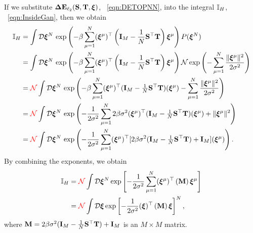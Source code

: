 If we substitute $\mathbf{\Delta {E}}_{\ell_2}({\mathbf{S}},{\mathbf{T}}, \boldsymbol{\xi})$, \EQN~\ref{eqn:DETOPNN}, into the integral $\mathbb{I}_{H}$, \EQN~\ref{eqn:InsideGan}, then we obtain
\begin{align}
\label{eqn:I_1} 
\mathbb{I}_{H} 
  & =  \int \mathcal{D}\boldsymbol{\xi}^{N} \, \exp \left( -\beta\sum_{\mu=1}^{N} (\boldsymbol{\xi}^{\mu})^{\top} \left(\mathbf{I}_{M}-\frac{1}{N} {\mathbf{S}}^{\top}{\mathbf{T}} \right) \boldsymbol{\xi}^{\mu} \right) P(\boldsymbol{\xi}^{N})  \\
\nonumber
  & =  \int \mathcal{D}\boldsymbol{\xi}^{N} \, \exp \left( -\beta\sum_{\mu=1}^{N} (\boldsymbol{\xi}^{\mu})^{\top} \left(\mathbf{I}_{M}-\frac{1}{N} {\mathbf{S}}^{\top}{\mathbf{T}} \right) \boldsymbol{\xi}^{\mu} \right) \mathcal{N} \exp\left( - \sum_{\mu=1}^{N} \frac{\|\boldsymbol{\xi}^{\mu}\|^2}{2 \sigma^2} \right)  \\
    \nonumber
  &= {\color{red}\sf{\mathcal{N}}} \int \mathcal{D}\boldsymbol{\xi}^{N} \, \exp \left(
    -\beta\sum_{\mu=1}^{N} (\boldsymbol{\xi}^{\mu})^{\top} (\mathbf{I}_{M}-\tfrac{1}{N}{\mathbf{S}}^{\top}{\mathbf{T}}) (\boldsymbol{\xi}^{\mu}) 
    - \sum_{\mu=1}^{N} \frac{\|\boldsymbol{\xi}^{\mu}\|^2}{2 \sigma^2} \right) \\ 
\nonumber
  &= {\color{red}\sf{\mathcal{N}}} \int \mathcal{D}\boldsymbol{\xi}^{N} \, \exp \left(
    -\frac{1}{2\sigma^2}\sum_{\mu=1}^{N}2\beta\sigma^{2} (\boldsymbol{\xi}^{\mu})^{\top} (\mathbf{I}_{M}-\tfrac{1}{N}{\mathbf{S}}^{\top}{\mathbf{T}}) (\boldsymbol{\xi}^{\mu}) 
    +  \Vert\boldsymbol{\xi}^{\mu}\Vert^{2} \right) \\ 
\label{eqn:I_3} 
  &= {\color{red}\sf{\mathcal{N}}} \int \mathcal{D}\boldsymbol{\xi}^{N} \, \exp \left(
    -\frac{1}{2\sigma^2}      
      \sum_{\mu=1}^{N}
          (\boldsymbol{\xi}^{\mu})^{\top}[
      2\beta\sigma^{2} (\mathbf{I}_{M}-\tfrac{1}{N}{\mathbf{S}}^{\top}{\mathbf{T}})+\mathbf{I}_{M}] (\boldsymbol{\xi}^{\mu})\right)  .
\end{align}
%
By combining the exponents, we obtain
\begin{align}
\nonumber
\mathbb{I}_{H}
  &=  {\color{red}\sf{\mathcal{N}}}\int \mathcal{D}\boldsymbol{\xi}^{N} 
  \exp\left[
    -\frac{1}{2\sigma^2}\sum_{\mu=1}^{N}(\boldsymbol{\xi}^{\mu})^{\top}
    \left(\mathbf{M}
    \right)
    \boldsymbol{\xi}^{\mu}
    \right ]\\ 
\label{eqn:I_4} 
  &=  {\color{red}\sf{\mathcal{N}}}\int \mathcal{D}\boldsymbol{\xi}  
 \exp\left[
    -\frac{1}{2\sigma^2}(\boldsymbol{\xi})^{\top}
    \left(\mathbf{M}
    \right)
    \boldsymbol{\xi}
    \right]^{N}   ,
\end{align}
where $\mathbf{M}=2\beta\sigma^{2}(\mathbf{I}_{M} - \tfrac{1}{N}{\mathbf{S}}^{\top}{\mathbf{T}})+\mathbf{I}_{M}$ is an $M \times M$ matrix.

